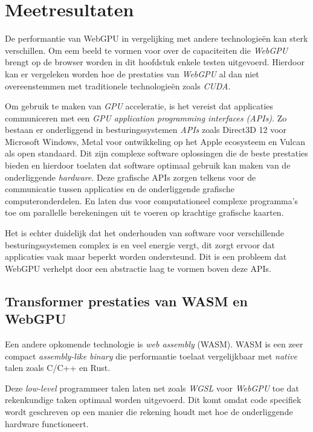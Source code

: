 \chapter{Meetresultaten}%
\label{ch:benchmarks}

De performantie van WebGPU in vergelijking met andere technologieën kan sterk verschillen. Om eem beeld te vormen voor over de capaciteiten die \textit{WebGPU} brengt op de browser worden in dit hoofdstuk enkele testen uitgevoerd. Hierdoor kan er vergeleken worden hoe de prestaties van \textit{WebGPU} al dan niet overeenstemmen met traditionele technologieën zoals \textit{CUDA}.

\bigbreak{}

Om gebruik te maken van \textit{GPU} acceleratie, is het vereist dat applicaties communiceren met een \textit{GPU application programming interfaces (APIs)}. Zo bestaan er onderliggend in besturingssystemen \textit{APIs} zoals Direct3D 12 voor Microsoft Windows, Metal voor ontwikkeling op het Apple ecosysteem en Vulcan als open standaard. Dit zijn complexe software oplossingen die de beste prestaties bieden en hierdoor toelaten dat software optimaal gebruik kan maken van de onderliggende \textit{hardware}. Deze grafische APIs zorgen telkens voor de communicatie tussen applicaties en de onderliggende grafische computeronderdelen. En laten dus voor computationeel complexe programma's toe om parallelle berekeningen uit te voeren op krachtige grafische kaarten.

\bigbreak{}

Het is echter duidelijk dat het onderhouden van software voor verschillende besturingssystemen complex is en veel energie vergt, dit zorgt ervoor dat applicaties vaak maar beperkt worden ondersteund. Dit is een probleem dat WebGPU verhelpt door een abstractie laag te vormen boven deze APIs. \autocite{Wallez2023} 

\break{}

\section{Transformer prestaties van WASM en WebGPU}

Een andere opkomende technologie is  \textit{web assembly} (WASM). WASM is een zeer compact \textit{assembly-like binary} die performantie toelaat vergelijkbaar met \textit{native} talen zoals C/C++ en Rust. \autocite{Steiner2023} 

\bigbreak{}

Deze \textit{low-level} programmeer talen laten net zoals \textit{WGSL} voor \textit{WebGPU} toe dat rekenkundige taken optimaal worden uitgevoerd. Dit komt omdat code specifiek wordt geschreven op een manier die rekening houdt met hoe de onderliggende hardware functioneert.

